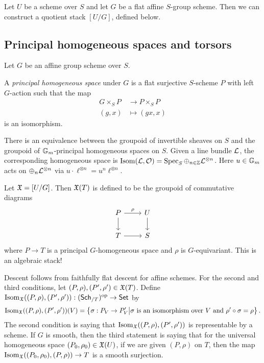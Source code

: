 \documentclass{amsart}
\begin{document}
\begin{ex}
	Let $U$ be a scheme over $S$ and let $G$ be a flat affine $S$-group scheme.
	Then we can construct a quotient stack $[U/G]$, defined below.
\end{ex}

\subsection{Principal homogeneous spaces and torsors}

Let $G$ be an affine group scheme over $S$.

\begin{dfn}
	A \emph{principal homogeneous space} under $G$ is a flat surjective $S$-scheme $P$ with left $G$-action such that the map 
	\begin{align*}
		G \times_S P &\to P \times_S P \\
		(g, x) &\mapsto (gx, x)
	\end{align*}
	is an isomorphism.
\end{dfn}

\begin{ex}
	There is an equivalence between the groupoid of invertible sheaves on $S$ and the groupoid of $\mathbb{G}_m$-principal homogeneous spaces on $S$.
	Given a line bundle $\mathcal{L}$, the corresponding homogeneous space is $\operatorname{Isom}(\mathcal{L}, \mathcal{O}) = \operatorname{Spec}_S \oplus_{n \in \mathbb{Z}} \mathcal{L}^{\otimes n}$.
	Here $u \in \mathbb{G}_m$ acts on $\oplus_n \mathcal{L}^{\otimes n}$ via $u \cdot \ell^{\otimes n} = u^n \ell^{\otimes n}$.
\end{ex}

Let $\mathfrak{X} = [U / G]$.
Then $\mathfrak{X}(T)$ is defined to be the groupoid of commutative diagrams
\[
	\begin{tikzcd}
		P \rar["\rho"] \dar & U \dar \\
		T \rar & S
	\end{tikzcd}
\]
where $P \to T$ is a principal $G$-homogeneous space and $\rho$ is $G$-equivariant.
This is an algebraic stack!

Descent follows from faithfully flat descent for affine schemes.
For the second and third conditions, let $(P, \rho), (P', \rho') \in \mathfrak{X}(T)$.
Define $\operatorname{Isom}_{\mathfrak{X}}((P, \rho), (P', \rho')): (\mathsf{Sch}_{/T})^{\mathrm{op}} \to \mathsf{Set}$ by 
\[
	\operatorname{Isom}_{\mathfrak{X}}((P, \rho), (P', \rho'))(V) = \left\{ \sigma: P_V \to P'_V \big| \sigma \textrm{ is an isomorphism over $V$ and } \rho' \circ \sigma = \rho \right\}.
\]
The second condition is saying that $\operatorname{Isom}_{\mathfrak{X}}((P, \rho), (P', \rho'))$ is representable by a scheme.
If $G$ is smooth, then the third statement is saying that for the universal homogeneous space $(P_0, \rho_0) \in \mathfrak{X}(U)$, if we are given $(P, \rho)$ on $T$, then the map $\operatorname{Isom}_{\mathfrak{X}}((P_0, \rho_0), (P, \rho)) \to T$ is a smooth surjection.
\end{document}

